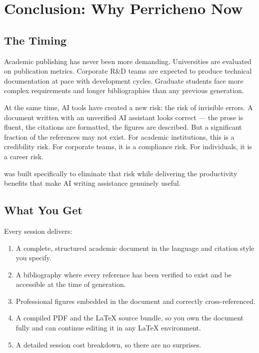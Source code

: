 \section{Conclusion: Why Perricheno Now}
\label{sec:conclusion}

\subsection{The Timing}

Academic publishing has never been more demanding.
Universities are evaluated on publication metrics.
Corporate R\&D teams are expected to produce technical documentation at pace
with development cycles.
Graduate students face more complex requirements and longer bibliographies
than any previous generation.

At the same time, AI tools have created a new risk: the risk of invisible errors.
A document written with an unverified AI assistant looks correct — the prose is
fluent, the citations are formatted, the figures are described.
But a significant fraction of the references may not exist.
For academic institutions, this is a credibility risk.
For corporate teams, it is a compliance risk.
For individuals, it is a career risk.

\sys{} was built specifically to eliminate that risk while delivering the productivity
benefits that make AI writing assistance genuinely useful.

\subsection{What You Get}

Every \sys{} session delivers:

\begin{enumerate}
  \item A complete, structured academic document in the language and citation style
        you specify.
  \item A bibliography where every reference has been verified to exist and be
        accessible at the time of generation.
  \item Professional figures embedded in the document and correctly cross-referenced.
  \item A compiled PDF and the \LaTeX{} source bundle, so you own the document
        fully and can continue editing it in any \LaTeX{} environment.
  \item A detailed session cost breakdown, so there are no surprises.
\end{enumerate}

